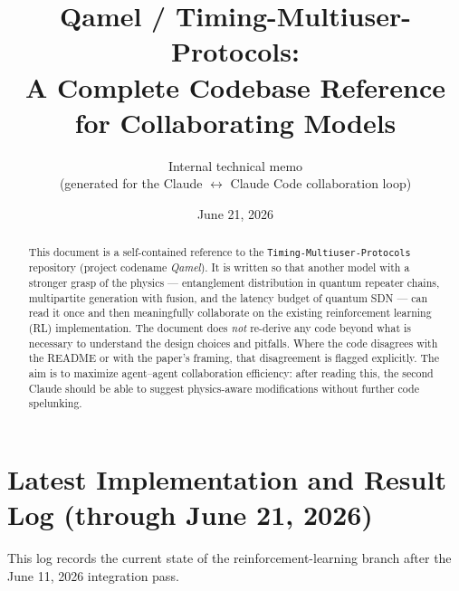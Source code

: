 \documentclass[11pt]{article}
\title{Qamel / Timing-Multiuser-Protocols:\\
A Complete Codebase Reference for Collaborating Models}
\author{Internal technical memo\\(generated for the Claude $\leftrightarrow$ Claude Code collaboration loop)}
\date{June 21, 2026}
\newcommand{\code}[1]{\texttt{#1}}
\begin{document}
\maketitle

\begin{abstract}
This document is a self-contained reference to the \code{Timing-Multiuser-Protocols} repository (project codename \emph{Qamel}). It is written so that another model with a stronger grasp of the physics --- entanglement distribution in quantum repeater chains, multipartite generation with fusion, and the latency budget of quantum SDN --- can read it once and then meaningfully collaborate on the existing reinforcement learning (RL) implementation. The document does \emph{not} re-derive any code beyond what is necessary to understand the design choices and pitfalls. Where the code disagrees with the README or with the paper's framing, that disagreement is flagged explicitly. The aim is to maximize agent--agent collaboration efficiency: after reading this, the second Claude should be able to suggest physics-aware modifications without further code spelunking.
\end{abstract}

\tableofcontents
\clearpage

\section{Latest Implementation and Result Log (through June 21, 2026)}
\label{sec:latest-log}

This log records the current state of the reinforcement-learning branch after the June 11, 2026 integration pass.
\end{document}
